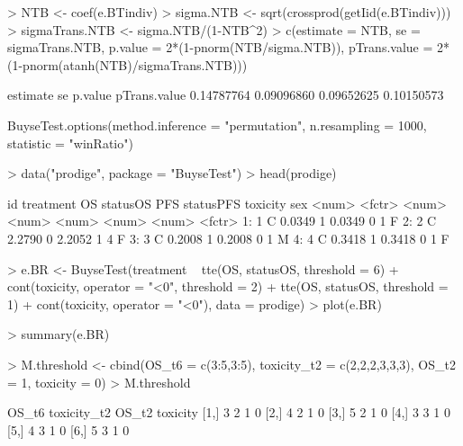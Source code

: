 \documentclass[12pt]{article}
\theoremstyle{definition}
\begin{document}
\begin{Rcode}
> NTB <- coef(e.BTindiv)
> sigma.NTB <- sqrt(crossprod(getIid(e.BTindiv)))
> sigmaTrans.NTB <- sigma.NTB/(1-NTB^2)
> c(estimate = NTB, se = sigmaTrans.NTB, p.value = 2*(1-pnorm(NTB/sigma.NTB)),
    pTrans.value = 2*(1-pnorm(atanh(NTB)/sigmaTrans.NTB)))
\end{Rcode}

\begin{Routput}
  estimate           se      p.value pTrans.value 
0.14787764   0.09096860   0.09652625   0.10150573 
\end{Routput}


\begin{Rcode}
BuyseTest.options(method.inference = "permutation", n.resampling = 1000,
                  statistic = "winRatio")
\end{Rcode}


\begin{Rcode}
> data("prodige", package = "BuyseTest")
> head(prodige)
\end{Rcode}

\begin{Routput}
    id treatment     OS statusOS    PFS statusPFS toxicity    sex
<num>    <fctr>  <num>    <num>  <num>     <num>    <num> <fctr>
1:     1         C 0.0349        1 0.0349         0        1      F
2:     2         C 2.2790        0 2.2052         1        4      F
3:     3         C 0.2008        1 0.2008         0        1      M
4:     4         C 0.3418        1 0.3418         0        1      F
\end{Routput}

\begin{Rcode}
> e.BR <- BuyseTest(treatment ~ tte(OS, statusOS, threshold = 6)
                + cont(toxicity, operator = "<0", threshold = 2) 
                + tte(OS, statusOS, threshold = 1) 
                + cont(toxicity, operator = "<0"), 
                    data = prodige)
> plot(e.BR)
\end{Rcode}

\begin{Rcode}
> summary(e.BR)
\end{Rcode}

\begin{Rcode}
> M.threshold <- cbind(OS_t6 = c(3:5,3:5),
                       toxicity_t2 = c(2,2,2,3,3,3),
                       OS_t2 = 1,
                       toxicity = 0)
> M.threshold
\end{Rcode}
\begin{Routput}
     OS_t6 toxicity_t2 OS_t2 toxicity
[1,]     3           2     1        0
[2,]     4           2     1        0
[3,]     5           2     1        0
[4,]     3           3     1        0
[5,]     4           3     1        0
[6,]     5           3     1        0
\end{Routput}
\end{document}
